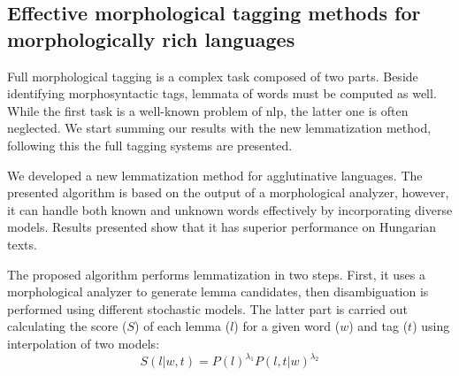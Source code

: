 \let\oldthesubsection=\thesubsection
\renewcommand{\thesubsection}{\Roman{subsection}}

%
%

\subsection{Effective morphological tagging methods for morphologically rich languages} %
\label{thes:morf}

Full morphological tagging is a complex task composed of two parts. 
Beside identifying morphosyntactic tags, lemmata of words must be computed as well.
While the first task is a well-known problem of \acrlong{nlp}, the latter one is often neglected.
We start summing our results with the new lemmatization method, following this the full tagging systems are presented. 


\begin{core}
\begin{thesis}\label{thes:morf-lemma}
We developed a new lemmatization method for agglutinative languages.
The presented algorithm is based on the output of a morphological analyzer, however, it can handle both known and unknown words effectively by incorporating diverse models. 
Results presented show that it has superior performance on Hungarian texts.
\end{thesis} 

\begin{pub}
\cite{Orosz2011,Orosz2012,Orosz2012a,Orosz2013a}
\end{pub}
\end{core}

The proposed algorithm performs lemmatization in two steps. 
First, it uses a morphological analyzer to generate lemma candidates, then disambiguation is performed using different stochastic models.
The latter part is carried out calculating the score ($S$) of each lemma ($l$) for a given word ($w$) and tag ($t$) using interpolation of two models:
\begin{equation} %
S(l|w,t) = P(l)^{\lambda_1} P(l,t|w)^{\lambda_2}
\end{equation}

